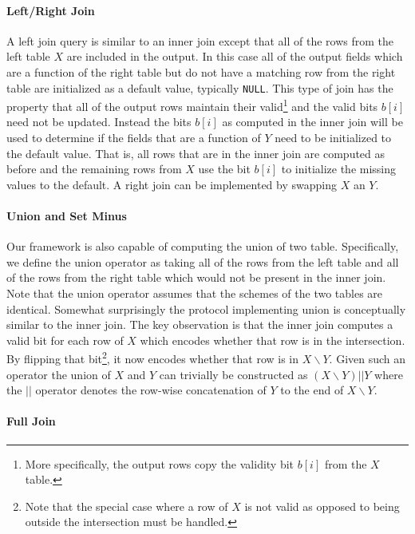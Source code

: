 \paragraph{Left/Right Join}

A left join query is similar to an inner join except that all of the rows from the left table $X$ are included in the output. In this case all of the output fields which are a function of the right table but do not have a matching row from the right table are initialized as a default value, typically \texttt{NULL}.  This type of join has the property that all of the output rows maintain their valid\footnote{More specifically, the output rows copy the validity bit $b[i]$ from the $X$ table.} and the valid bits $b[i]$ need not be updated. Instead the bits $b[i]$ as computed in the inner join will be used to determine if the fields that are a function of $Y$ need to be initialized to the default value. That is, all rows that are in the inner join are computed as before and the remaining rows from $X$ use the bit $b[i]$ to initialize the missing values to the default. A right join can be implemented by swapping $X$ an $Y$.

\paragraph{Union and Set Minus}

Our framework is also capable of computing the union of two table. Specifically, we define the union operator as taking all of the rows from the left table and all of the rows from the right table which would not be present in the inner join. Note that the union operator assumes that the schemes of the two tables are identical. Somewhat surprisingly the protocol implementing union is conceptually similar to the inner join. The key observation is that the inner join computes a valid bit for each row of $X$ which encodes whether that row is in the intersection. By flipping that bit\footnote{Note that the special case where a row of $X$ is not valid as opposed to being outside the intersection must be handled.}, it now encodes whether that row is in $X\backslash Y$. Given such an operator the union of $X$ and $Y$ can trivially be constructed as $(X\backslash Y) || Y$ where the $||$ operator denotes the row-wise concatenation of $Y$ to the end of $X\backslash Y$.


\paragraph{Full Join}

